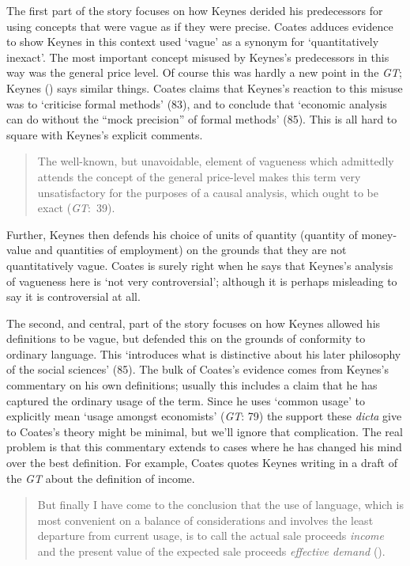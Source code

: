 \documentclass[
  10pt,
  letterpaper,
  DIV=11,
  numbers=noendperiod,
  twoside]{scrartcl}
\begin{document}
The first part of the story focuses on how Keynes derided his
predecessors for using concepts that were vague as if they were precise.
Coates adduces evidence to show Keynes in this context used `vague' as a
synonym for `quantitatively inexact'. The most important concept misused
by Keynes's predecessors in this way was the general price level. Of
course this was hardly a new point in the \emph{GT}; Keynes
() says similar things. Coates claims
that Keynes's reaction to this misuse was to `criticise formal methods'
(83), and to conclude that `economic analysis can do without the ``mock
precision'' of formal methods' (85). This is all hard to square with
Keynes's explicit comments.

\begin{quote}
The well-known, but unavoidable, element of vagueness which admittedly
attends the concept of the general price-level makes this term very
unsatisfactory for the purposes of a causal analysis, which ought to be
exact (\emph{GT}:~39).
\end{quote}

Further, Keynes then defends his choice of units of quantity (quantity
of money-value and quantities of employment) on the grounds that they
are not quantitatively vague. Coates is surely right when he says that
Keynes's analysis of vagueness here is `not very controversial';
although it is perhaps misleading to say it is controversial at all.

The second, and central, part of the story focuses on how Keynes allowed
his definitions to be vague, but defended this on the grounds of
conformity to ordinary language. This `introduces what is distinctive
about his later philosophy of the social sciences' (85). The bulk of
Coates's evidence comes from Keynes's commentary on his own definitions;
usually this includes a claim that he has captured the ordinary usage of
the term. Since he uses `common usage' to explicitly mean `usage amongst
economists' (\emph{GT}: 79) the support these \emph{dicta} give to
Coates's theory might be minimal, but we'll ignore that complication.
The real problem is that this commentary extends to cases where he has
changed his mind over the best definition. For example, Coates quotes
Keynes writing in a draft of the \emph{GT} about the definition of
income.

\begin{quote}
But finally I have come to the conclusion that the use of language,
which is most convenient on a balance of considerations and involves the
least departure from current usage, is to call the actual sale proceeds
\emph{income} and the present value of the expected sale proceeds
\emph{effective demand} ().
\end{quote}
\end{document}

